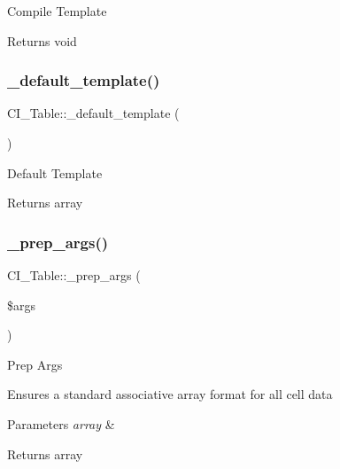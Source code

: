 Compile Template

\begin{DoxyReturn}{Returns}
void 
\end{DoxyReturn}
\mbox{\label{class_c_i___table_a1e130e424d32d8c1cd77af17f1343061}} 
\subsubsection{\texorpdfstring{\+\_\+default\+\_\+template()}{\_default\_template()}}
{\footnotesize\ttfamily C\+I\+\_\+\+Table\+::\+\_\+default\+\_\+template (\begin{DoxyParamCaption}{ }\end{DoxyParamCaption})\hspace{0.3cm}{\ttfamily [protected]}}

Default Template

\begin{DoxyReturn}{Returns}
array 
\end{DoxyReturn}
\mbox{\label{class_c_i___table_a74e7e96f438364bdb9e20ae5f75fddeb}} 
\subsubsection{\texorpdfstring{\+\_\+prep\+\_\+args()}{\_prep\_args()}}
{\footnotesize\ttfamily C\+I\+\_\+\+Table\+::\+\_\+prep\+\_\+args (\begin{DoxyParamCaption}\item[{}]{\$args }\end{DoxyParamCaption})\hspace{0.3cm}{\ttfamily [protected]}}

Prep Args

Ensures a standard associative array format for all cell data


\begin{DoxyParams}{Parameters}
{\em array} & \\
\hline
\end{DoxyParams}
\begin{DoxyReturn}{Returns}
array 
\end{DoxyReturn}
\mbox{\label{class_c_i___table_af6649afb3ad3b8187d11aea588f82296}} 
